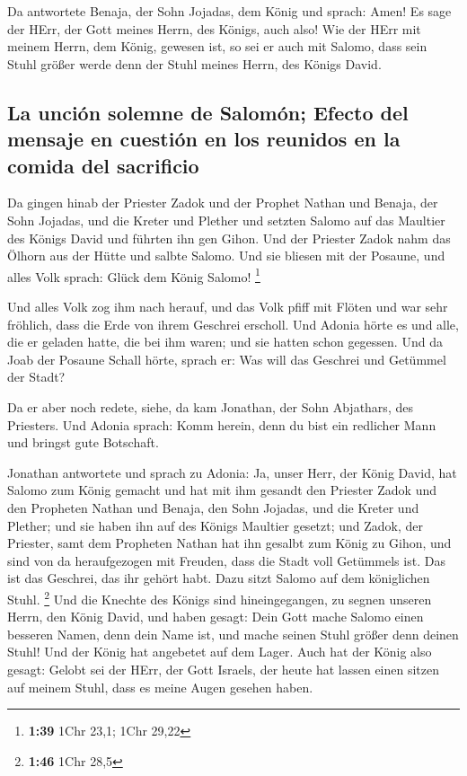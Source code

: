 Da antwortete Benaja, der Sohn Jojadas, dem König und
sprach: Amen! Es sage der HErr, der Gott meines Herrn, des Königs, auch
also!  Wie der HErr mit meinem Herrn, dem König, gewesen
ist, so sei er auch mit Salomo, dass sein Stuhl größer werde denn der
Stuhl meines Herrn, des Königs David.

\hypertarget{la-unciuxf3n-solemne-de-salomuxf3n-efecto-del-mensaje-en-cuestiuxf3n-en-los-reunidos-en-la-comida-del-sacrificio}{%
\subsection{La unción solemne de Salomón; Efecto del mensaje en cuestión
en los reunidos en la comida del
sacrificio}\label{la-unciuxf3n-solemne-de-salomuxf3n-efecto-del-mensaje-en-cuestiuxf3n-en-los-reunidos-en-la-comida-del-sacrificio}}

 Da gingen hinab der Priester Zadok und der Prophet
Nathan und Benaja, der Sohn Jojadas, und die Kreter und Plether und
setzten Salomo auf das Maultier des Königs David und führten ihn gen
Gihon.  Und der Priester Zadok nahm das Ölhorn aus der
Hütte und salbte Salomo. Und sie bliesen mit der Posaune, und alles Volk
sprach: Glück dem König Salomo! \footnote{\textbf{1:39} 1Chr 23,1; 1Chr
  29,22}

 Und alles Volk zog ihm nach herauf, und das Volk pfiff
mit Flöten und war sehr fröhlich, dass die Erde von ihrem Geschrei
erscholl.  Und Adonia hörte es und alle, die er geladen
hatte, die bei ihm waren; und sie hatten schon gegessen. Und da Joab der
Posaune Schall hörte, sprach er: Was will das Geschrei und Getümmel der
Stadt?

 Da er aber noch redete, siehe, da kam Jonathan, der Sohn
Abjathars, des Priesters. Und Adonia sprach: Komm herein, denn du bist
ein redlicher Mann und bringst gute Botschaft.

 Jonathan antwortete und sprach zu Adonia: Ja, unser
Herr, der König David, hat Salomo zum König gemacht  und
hat mit ihm gesandt den Priester Zadok und den Propheten Nathan und
Benaja, den Sohn Jojadas, und die Kreter und Plether; und sie haben ihn
auf des Königs Maultier gesetzt;  und Zadok, der
Priester, samt dem Propheten Nathan hat ihn gesalbt zum König zu Gihon,
und sind von da heraufgezogen mit Freuden, dass die Stadt voll Getümmels
ist. Das ist das Geschrei, das ihr gehört habt.  Dazu
sitzt Salomo auf dem königlichen Stuhl. \footnote{\textbf{1:46} 1Chr
  28,5}  Und die Knechte des Königs sind hineingegangen,
zu segnen unseren Herrn, den König David, und haben gesagt: Dein Gott
mache Salomo einen besseren Namen, denn dein Name ist, und mache seinen
Stuhl größer denn deinen Stuhl! Und der König hat angebetet auf dem
Lager.  Auch hat der König also gesagt: Gelobt sei der
HErr, der Gott Israels, der heute hat lassen einen sitzen auf meinem
Stuhl, dass es meine Augen gesehen haben.


